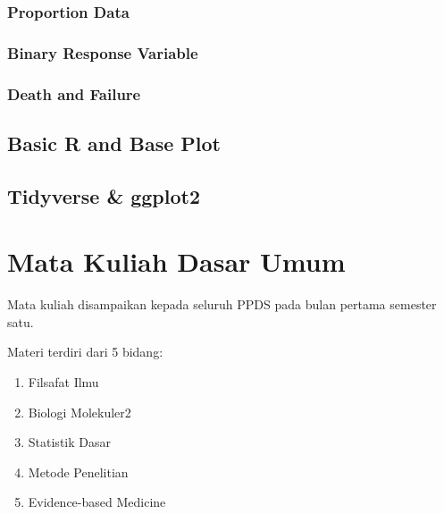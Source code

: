 \documentclass[
  letterpaper,
  DIV=11,
  numbers=noendperiod]{scrreprt}
\providecommand{\tightlist}{%
  \setlength{\itemsep}{0pt}\setlength{\parskip}{0pt}}\usepackage{longtable,booktabs,array}
\begin{document}

\section*{Proportion Data}\label{proportion-data}


\section*{Binary Response Variable}\label{binary-response-variable}


\section*{Death and Failure}\label{death-and-failure}


\chapter{Basic R and Base Plot}\label{basic-r-and-base-plot}

\chapter{Tidyverse \& ggplot2}\label{tidyverse-ggplot2}

\part{Mata Kuliah Dasar Umum}

Mata kuliah disampaikan kepada seluruh PPDS pada bulan pertama semester
satu.

Materi terdiri dari 5 bidang:

\begin{enumerate}
\def\labelenumi{\arabic{enumi}.}
\tightlist
\item
  Filsafat Ilmu
\item
  Biologi Molekuler2
\item
  Statistik Dasar
\item
  Metode Penelitian
\item
  Evidence-based Medicine
\end{enumerate}
\end{document}
